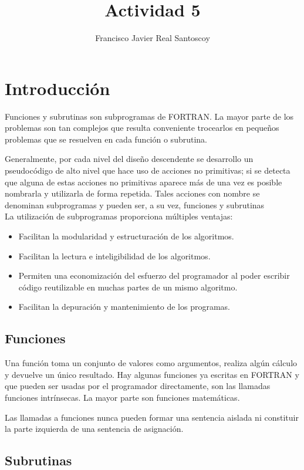 \documentclass[12pt,a4paper,openright]{article}
\author{Francisco Javier Real Santoscoy}
\title{Actividad 5}
\begin{document}
\maketitle

\section*{Introducción}

Funciones y subrutinas son subprogramas de FORTRAN. La mayor parte de los problemas son tan complejos que resulta conveniente trocearlos en pequeños problemas que se resuelven en cada función o subrutina.

Generalmente, por cada nivel del diseño descendente se desarrollo un pseudocódigo de alto nivel que hace
uso de acciones no primitivas; si se detecta que alguna de estas acciones no primitivas aparece más de una vez es
posible nombrarla y utilizarla de forma repetida. Tales acciones con nombre se denominan subprogramas y pueden ser,
a su vez, funciones y subrutinas \\

La utilización de subprogramas proporciona múltiples ventajas:
\begin{itemize}
\item Facilitan la modularidad y estructuración de los algoritmos.
\item Facilitan la lectura e inteligibilidad de los algoritmos.
\item Permiten una economización del esfuerzo del programador al poder escribir código reutilizable en muchas
partes de un mismo algoritmo.
\item Facilitan la depuración y mantenimiento de los programas.
\end{itemize}


\subsection*{Funciones}

Una función toma un conjunto de valores como argumentos, realiza algún cálculo y devuelve un único resultado. Hay algunas funciones ya escritas en FORTRAN y que pueden ser usadas por el programador directamente, son las llamadas funciones intrínsecas. La mayor parte son funciones matemáticas.

Las llamadas a funciones nunca
pueden formar una sentencia aislada ni constituir la parte izquierda de una sentencia de asignación.

\subsection*{Subrutinas}
\end{document}
